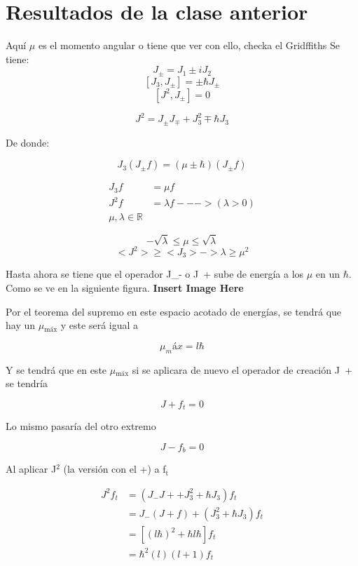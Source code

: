 \documentclass[11pt]{article}
\begin{document}
\section{Resultados de la clase anterior}
\label{sec-2}
Aquí $\mu$ es el momento angular o tiene que ver con ello, checka el Gridffiths
Se tiene:
$$ J_\pm = J_1 \pm iJ_2 $$
$$ [J_3,J_\pm] = \pm \hbar J_\pm $$
$$ [J^2, J_\pm] = 0 $$

$$ J^2 = J_\pm J_\mp + J_3^2 \mp\hbar J_3 $$

De donde:

$$ J_3 (J_\pm f) = (\mu \pm \hbar)(J_\pm f) $$

\begin{equation}
\label{baseeq}
\begin{split}
J_3 f & = \mu f   \\
J^2 f & = \lambda f ---> (\lambda > 0) \\
\mu,\lambda \in \mathbb{R}
\end{split}
\end{equation}


$$ -\sqrt\lambda \leq \mu \leq \sqrt\lambda $$
$$ <J^2> \geq <J_3> -> \lambda \geq \mu^2  $$

Hasta ahora se tiene que el operador J\_- o J + sube de energía a los
$\mu$ en un $\hbar$. Como se ve en la siguiente figura. \textbf{Insert Image Here}

Por el teorema del supremo en este espacio acotado de energías, se
tendrá que hay un $\mu$$_{\text{máx}}$ y este será igual a

$$ \mu_máx = l\hbar $$

Y se tendrá que en este $\mu$$_{\text{máx}}$ si se aplicara de nuevo el operador de
creación J + se tendría

$$ J + f_t = 0 $$

Lo mismo pasaría del otro extremo

$$ J - f_b = 0 $$

Al aplicar J$^{\text{2}}$ (la versión con el +) a f$_{\text{t}}$

\begin{equation}
\label{eq1}
\begin{split}
  J^2 f_t & = (J_- J + + J_3^2 + \hbar J_3) f_t \\
          & = J_-(J + f) + (J_3^2 + \hbar J_3)f_t \\
          & = [(l\hbar)^2 + \hbar l\hbar] f_t \\
          & = \hbar^2 (l) (l+1)f_t \\

\end{split}
\end{equation}
\end{document}
